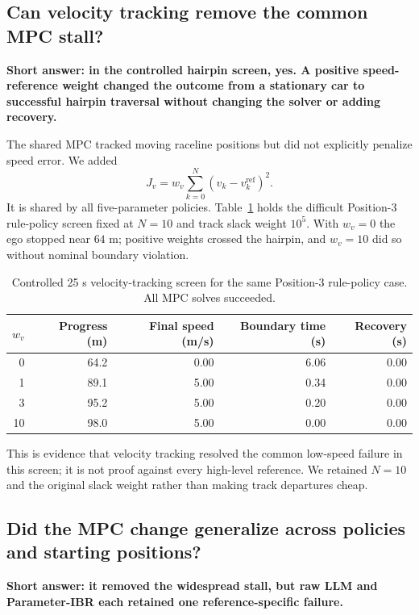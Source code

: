\documentclass[11pt]{article}
\begin{document}
\subsection{Can velocity tracking remove the common MPC stall?}

\noindent\textbf{Short answer: in the controlled hairpin screen, yes. A positive
speed-reference weight changed the outcome from a stationary car to successful
hairpin traversal without changing the solver or adding recovery.}

The shared MPC tracked moving raceline positions but did not explicitly penalize
speed error. We added
\[
  J_v=w_v\sum_{k=0}^{N}(v_k-v_k^{\mathrm{ref}})^2.
\]
It is shared by all five-parameter policies. Table~\ref{tab:velocity-screen}
holds the difficult Position-3 rule-policy screen fixed at $N=10$ and track
slack weight $10^5$. With $w_v=0$ the ego stopped near $64$ m; positive weights
crossed the hairpin, and $w_v=10$ did so without nominal boundary violation.

\begin{table}[ht]
  \centering
  \small
  \begin{tabular}{rrrrr}
    \toprule
    $w_v$ & Progress (m) & Final speed (m/s) & Boundary time (s) & Recovery (s) \\
    \midrule
    0  & 64.2 & 0.00 & 6.06 & 0.00 \\
    1  & 89.1 & 5.00 & 0.34 & 0.00 \\
    3  & 95.2 & 5.00 & 0.20 & 0.00 \\
    10 & 98.0 & 5.00 & 0.00 & 0.00 \\
    \bottomrule
  \end{tabular}
  \caption{Controlled 25 s velocity-tracking screen for the same Position-3
  rule-policy case. All MPC solves succeeded.}
  \label{tab:velocity-screen}
\end{table}

This is evidence that velocity tracking resolved the common low-speed failure
in this screen; it is not proof against every high-level reference. We retained
$N=10$ and the original slack weight rather than making track departures cheap.

\subsection{Did the MPC change generalize across policies and starting positions?}

\noindent\textbf{Short answer: it removed the widespread stall, but raw LLM and
Parameter-IBR each retained one reference-specific failure.}
\end{document}
